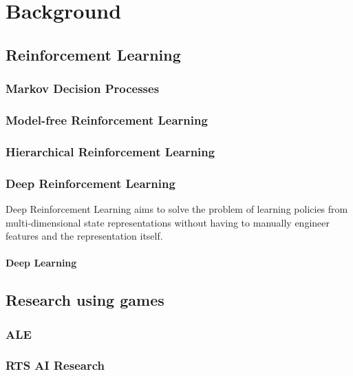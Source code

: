 

\chapter{Background}

\section{Reinforcement Learning}

\subsection{Markov Decision Processes}

\subsection{Model-free Reinforcement Learning}

\subsection{Hierarchical Reinforcement Learning}

\subsection{Deep Reinforcement Learning}

Deep Reinforcement Learning aims to solve the problem of learning policies from
multi-dimensional state representations without having to manually engineer
features and the representation itself.

\subsubsection{Deep Learning}

\section{Research using games}

\subsection{ALE}

\subsection{RTS AI Research}

